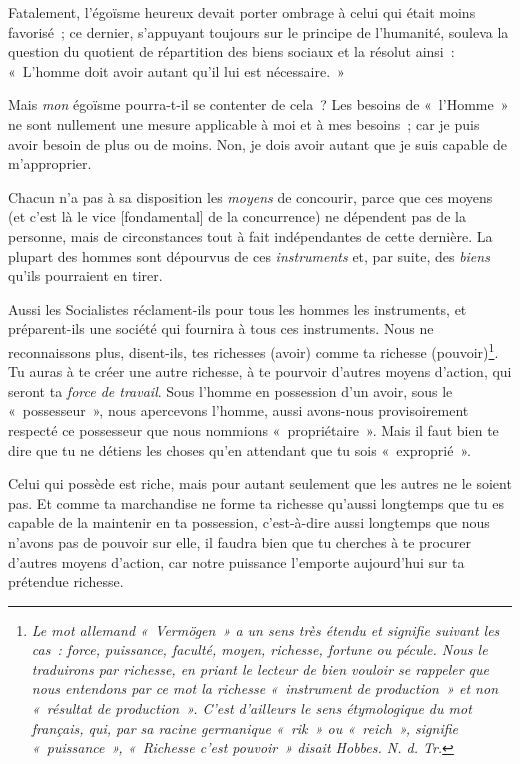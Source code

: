 \documentclass[french,twoside]{book} %
\newcommand\corr[1]{#1}
\begin{document}
Fatalement, l’égoïsme heureux devait porter ombrage à celui qui était moins favorisé ; ce dernier, s’appuyant toujours sur le principe de l’humanité, souleva la question du quotient de répartition des biens sociaux et la résolut ainsi : « L’homme doit avoir autant qu’il lui est nécessaire. »\par
Mais \emph{mon} égoïsme pourra-t-il se contenter de cela ? Les besoins de « l’Homme » ne sont nullement une mesure applicable à moi et à mes besoins ; car je puis avoir besoin de plus ou de moins. Non, je dois avoir autant que je suis capable de m’approprier.\par
Chacun n’a pas à sa disposition les \emph{moyens} de concourir, parce que ces moyens (et c’est là le vice [{\corr fondamental}] de la concurrence) ne dépendent pas de la personne, mais de circonstances tout à fait indépendantes de cette dernière. La plupart des hommes sont dépourvus de ces \emph{instruments} et, par suite, des \emph{biens} qu’ils pourraient en tirer.\par
Aussi les Socialistes réclament-ils pour tous les hommes les instruments, et préparent-ils une société qui fournira à tous ces instruments. Nous ne reconnaissons plus, disent-ils, tes richesses (avoir) comme  ta richesse (pouvoir)\footnote{ \noindent \emph{Le mot allemand « Vermögen » a un sens très étendu et signifie suivant les cas : force, puissance, faculté, moyen, richesse, fortune ou pécule. Nous le traduirons par richesse, en priant le lecteur de bien vouloir se rappeler que nous entendons par ce mot la richesse « instrument de production » et non « résultat de production ». C’est d’ailleurs le sens étymologique du mot français, qui, par sa racine germanique « rik » ou « reich », signifie « puissance », « Richesse c’est pouvoir » disait Hobbes. N. d. Tr.}
 }. Tu auras à te créer une autre richesse, à te pourvoir d’autres moyens d’action, qui seront ta \emph{force de travail}. Sous l’homme en possession d’un avoir, sous le « possesseur », nous apercevons l’homme, aussi avons-nous provisoirement respecté ce possesseur que nous nommions « propriétaire ». Mais il faut bien te dire que tu ne détiens les choses qu’en attendant que tu sois « exproprié ».\par
Celui qui possède est riche, mais pour autant seulement que les autres ne le soient pas. Et comme ta marchandise ne forme ta richesse qu’aussi longtemps que tu es capable de la maintenir en ta possession, c’est-à-dire aussi longtemps que nous n’avons pas de pouvoir sur elle, il faudra bien que tu cherches à te procurer d’autres moyens d’action, car notre puissance l’emporte aujourd’hui sur ta prétendue richesse.\par
\end{document}
